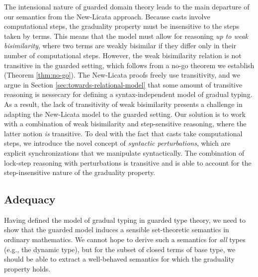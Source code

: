 The intensional nature of guarded domain theory leads to the main departure of
our semantics from the New-Licata approach. Because casts involve computational
steps, the graduality property must be insensitive to the steps taken by terms.
This means that the model must allow for reasoning \emph{up to weak
bisimilarity}, where two terms are weakly bisimilar if they differ only in their
number of computational steps. However, the weak bisimilarity relation is not
transitive in the guarded setting, which follows from a no-go theorem we
establish (Theorem \ref{thm:no-go}). The New-Licata proofs freely use
transitivity, and we argue in Section \ref{sec:towards-relational-model} that
some amount of transitive reasoning is nessecary for defining a
syntax-independent model of gradual typing. As a result, the lack of
transitivity of weak bisimilarity presents a challenge in adapting the
New-Licata model to the guarded setting. Our solution is to work with a
combination of weak bisimilarity and step-sensitive reasoning, where the latter
notion \emph{is} transitive. To deal with the fact that casts take computational
steps, we introduce the novel concept of \emph{syntactic perturbations}, which
are explicit synchronizations that we manipulate syntactically. The combination
of lock-step reasoning with perturbations is transitive and is able to account
for the step-insensitive nature of the graduality property.



\subsection{Adequacy}


Having defined the model of gradual typing in guarded type theory, we need to
show that the guarded model induces a sensible set-theoretic semantics in
ordinary mathematics. We cannot hope to derive such a semantics for \emph{all}
types (e.g., the dynamic type), but for the subset of closed terms of base type,
we should be able to extract a well-behaved semantics for which the graduality
property holds.

